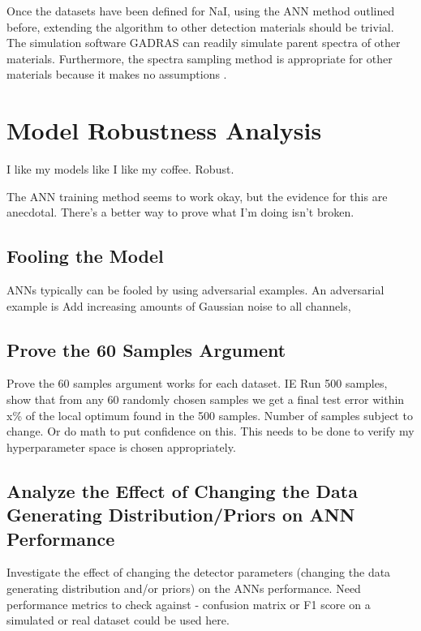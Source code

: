 \documentclass[thesis,tocnosub,noragright,centerchapter,12pt,fullpage]{uiucecethesis09}
\begin{document}
Once the datasets have been defined for NaI, using the ANN method outlined before, extending the algorithm to other detection materials should be trivial. The simulation software GADRAS can readily simulate parent spectra of other materials. Furthermore, the spectra sampling method is appropriate for other materials because it makes no assumptions .  

\section{Model Robustness Analysis}

I like my models like I like my coffee. Robust.

The ANN training method seems to work okay, but the evidence for this are anecdotal. There's a better way to prove what I'm doing isn't broken.

\subsection{Fooling the Model}

    ANNs typically can be fooled by using adversarial examples. An adversarial example is  
    Add increasing amounts of Gaussian noise to all channels, 



\subsection{Prove the 60 Samples Argument}

    

    Prove the 60 samples argument works for each dataset. IE Run 500 samples, show that from any 60 randomly chosen samples we get a final test error within x\% of the local optimum found in the 500 samples. Number of samples subject to change. Or do math to put confidence on this. This needs to be done to verify my hyperparameter space is chosen appropriately.    

\subsection{Analyze the Effect of Changing the Data Generating Distribution/Priors on ANN Performance}

    Investigate the effect of changing the detector parameters (changing the data generating distribution and/or priors) on the ANNs performance. Need performance metrics to check against - confusion matrix or F1 score on a simulated or real dataset could be used here. 
    
\end{document}
